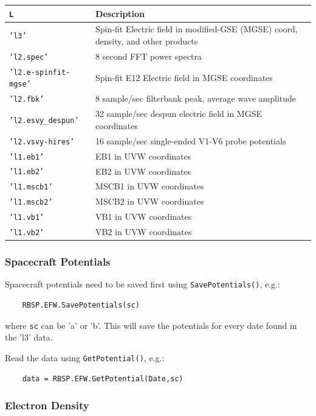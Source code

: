 	\begin{tabular}{|l|l|}
	\hline
	\texttt{L} & Description \\
	\hline
	\texttt{'l3'} & Spin-fit Electric field in modified-GSE (MGSE) coord, density, and other products \\
	\texttt{'l2.spec'} & 8 second FFT power spectra \\
	\texttt{'l2.e-spinfit-mgse'} & Spin-fit E12 Electric field in MGSE coordinates \\
	\texttt{'l2.fbk'} & 8 sample/sec filterbank peak, average wave amplitude \\
	\texttt{'l2.esvy\_despun'} & 32 sample/sec despun electric field in MGSE coordinates \\
	\texttt{'l2.vsvy-hires'} & 16 sample/sec single-ended V1-V6 probe potentials \\
	\texttt{'l1.eb1'} & EB1 in UVW coordinates \\
	\texttt{'l1.eb2'} & EB2 in UVW coordinates \\
	\texttt{'l1.mscb1'} & MSCB1 in UVW coordinates \\
	\texttt{'l1.mscb2'} & MSCB2 in UVW coordinates \\
	\texttt{'l1.vb1'} & VB1 in UVW coordinates \\
	\texttt{'l1.vb2'} & VB2 in UVW coordinates \\
	\hline
	\end{tabular}
	
	\subsubsection{Spacecraft Potentials}
	
	Spacecraft potentials need to be saved first using \texttt{SavePotentials()}, e.g.:
	
	\begin{verbatim}
	RBSP.EFW.SavePotentials(sc)
	\end{verbatim}
	
	where \texttt{sc} can be 'a' or 'b'. This will save the potentials for every date found in the 'l3' data.
	
	Read the data using \texttt{GetPotential()}, e.g.:
	
	\begin{verbatim}
	data = RBSP.EFW.GetPotential(Date,sc)
	\end{verbatim}
	
	\subsubsection{Electron Density}
	
